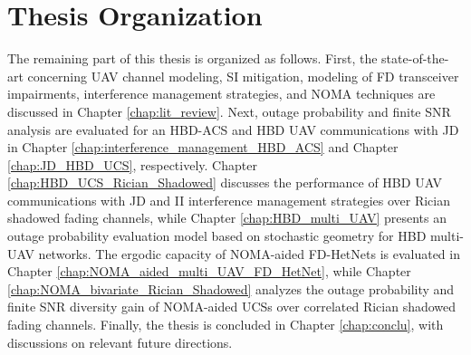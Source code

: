 \section{Thesis Organization}
The remaining part of this thesis is organized as follows. First, the state-of-the-art concerning UAV channel modeling, SI mitigation, modeling of FD transceiver impairments, interference management strategies, and NOMA techniques are discussed in Chapter \ref{chap:lit_review}. Next, outage probability and finite SNR analysis are evaluated for an HBD-ACS and HBD UAV communications with JD in Chapter \ref{chap:interference_management_HBD_ACS} and Chapter \ref{chap:JD_HBD_UCS}, respectively. Chapter \ref{chap:HBD_UCS_Rician_Shadowed} discusses the performance of HBD UAV communications with JD and II interference management strategies over Rician shadowed fading channels, while Chapter \ref{chap:HBD_multi_UAV} presents an outage probability evaluation model based on stochastic geometry for HBD multi-UAV networks. The ergodic capacity of NOMA-aided FD-HetNets is evaluated in Chapter \ref{chap:NOMA_aided_multi_UAV_FD_HetNet}, while Chapter \ref{chap:NOMA_bivariate_Rician_Shadowed} analyzes the outage probability and finite SNR diversity gain of NOMA-aided UCSs over correlated Rician shadowed fading channels. Finally, the thesis is concluded in Chapter \ref{chap:conclu}, with discussions on relevant future directions.












